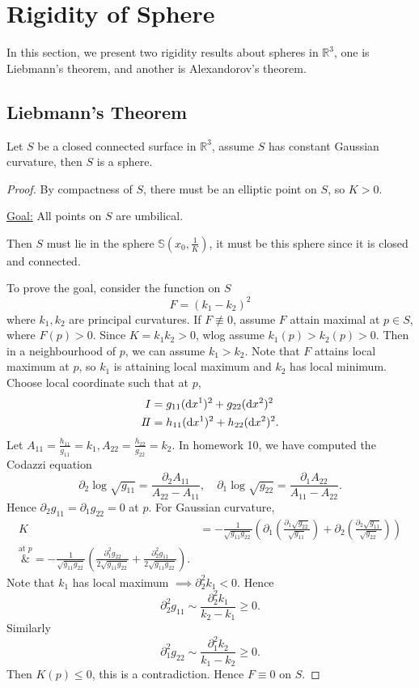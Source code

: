 \section{Rigidity of Sphere}
In this section, we present two rigidity results about spheres in \(\mathbb{R}^3\),
one is Liebmann's theorem, and another is Alexandorov's theorem.

\subsection{Liebmann's Theorem}
\begin{theorem}[Liebmann]
    Let \(S\) be a closed connected surface in \(\mathbb{R}^3\), assume \(S\) has
    constant Gaussian curvature, then \(S\) is a sphere.
\end{theorem}
\begin{proof}
    By compactness of \(S\), there must be an elliptic point on \(S\), so \(K>0\).
    
    \underline{Goal:} All points on \(S\) are umbilical.

    Then \(S\) must lie in the sphere \(\mathbb{S}(x_0,\frac{1}{K})\), it must be this
    sphere since it is closed and connected.

    To prove the goal, consider the function on \(S\) \[
        F=(k_1-k_2)^2
    \] where \(k_1,k_2\) are principal curvatures. If \(F\not\equiv 0\), assume
    \(F\) attain maximal at \(p\in S\), where \(F(p)>0\). Since \(K=k_1k_2>0\),
    wlog assume \(k_1(p)>k_2(p)>0\). Then in a neighbourhood of \(p\), we can assume
    \(k_1>k_2\). Note that \(F\) attains local maximum at \(p\), so \(k_1\) is
    attaining local maximum and \(k_2\) has local minimum.
    Choose local coordinate such that at \(p\),
    \begin{align*}
        I&=g_{11}(\dd{x^1})^2+g_{22}(\dd{x^2})^2 \\ 
        I\!I&=h_{11}(\dd{x^1})^2+h_{22}(\dd{x^2})^2
    .\end{align*}
    Let \(A_{11}=\frac{h_{11}}{g_{11}}=k_1,A_{22}=\frac{h_{22}}{g_{22}}=k_2\).
    In homework 10, we have computed the Codazzi equation \[
        \partial_2 \log\sqrt{g_{11}}=\frac{\partial_2 A_{11}}{A_{22}-A_{11}},
        \quad \partial_1\log\sqrt{g_{22}}=\frac{\partial_1 A_{22}}{A_{11}-A_{22}}
    .\] Hence \(\partial_2g_{11}=\partial_1g_{22}=0\) at \(p\).
    For Gaussian curvature,
    \begin{align*}
        K&=-\frac{1}{\sqrt{g_{11}g_{22}}}\left(\partial_1\left(\frac{\partial_1\sqrt{g_{22}}}{\sqrt{g_{11}}}\right)+\partial_2\left(\frac{\partial_2\sqrt{g_{11}}}{\sqrt{g_{22}}}\right)\right) \\
        \overset{\text{at }p}&{=}-\frac{1}{\sqrt{g_{11}g_{22}}}\left(\frac{\partial_1^2g_{22}}{2\sqrt{g_{11}g_{22}}}+\frac{\partial_2^2g_{11}}{2\sqrt{g_{11}g_{22}}}\right)
    .\end{align*}
    Note that \(k_1\) has local maximum \(\implies \partial_2^2k_1<0\). Hence \[
        \partial_2^2g_{11}\sim \frac{\partial_2^2k_1}{k_2-k_1}\ge 0
    .\] Similarly \[
        \partial_1^2g_{22}\sim \frac{\partial_1^2k_2}{k_1-k_2}\ge 0
    .\] Then \(K(p)\le 0\), this is a contradiction. Hence \(F\equiv 0\) on \(S\).
\end{proof}

